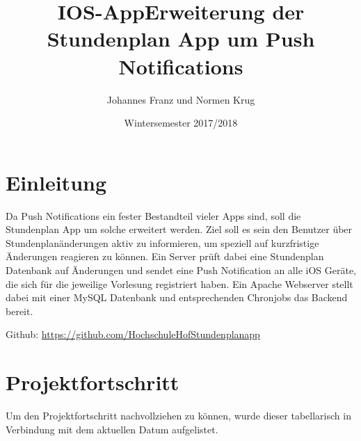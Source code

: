 \documentclass{article}
\begin{document}
\begin{titlepage}
\title{IOS-App}
\author{Johannes Franz und Normen Krug} 
	\title{Erweiterung der Stundenplan App um \newline Push Notifications}
	\date{Wintersemester 2017/2018} 
	\maketitle 
\end{titlepage}
\renewcommand{\contentsname}{Inhaltsverzeichnis}
\tableofcontents 
\newpage

\section{Einleitung}
Da Push Notifications ein fester Bestandteil vieler Apps sind, soll die Stundenplan App um solche erweitert werden. Ziel soll es sein den Benutzer über Stundenplanänderungen aktiv zu informieren, um speziell auf kurzfristige Änderungen reagieren zu können. Ein Server prüft dabei eine Stundenplan Datenbank auf Änderungen und sendet eine Push Notification an alle iOS Geräte, die sich für die jeweilige Vorlesung registriert haben. Ein Apache Webserver stellt dabei mit einer MySQL Datenbank und entsprechenden Chronjobs das Backend bereit.

Github: \url{https://github.com/HochschuleHofStundenplanapp}



\section{Projektfortschritt}
Um den Projektfortschritt nachvollziehen zu können, wurde dieser tabellarisch in Verbindung mit dem aktuellen Datum aufgelistet.\\
\end{document}
